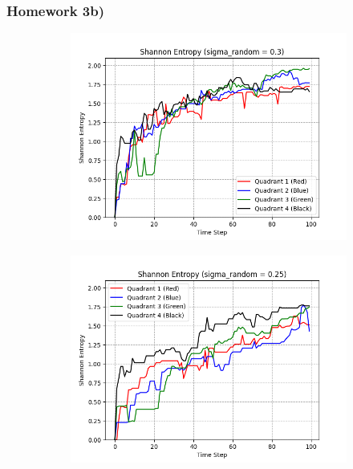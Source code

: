 \documentclass[]{scrartcl}
\begin{document}

\subsubsection*{Homework 3b)}

\begin{figure}[h!]
    \centering
    \begin{subfigure}[c]{0.49\textwidth}
        \includegraphics[width=\linewidth]{Shannon_Entropy_(sigma_random_=_0.3).png}
    \end{subfigure}\hfill
    \begin{subfigure}[c]{0.49\textwidth}
        \includegraphics[width=\linewidth]{Shannon_Entropy_(sigma_random_=_0.25).png}

\end{subfigure}
\end{figure}
\end{document}
